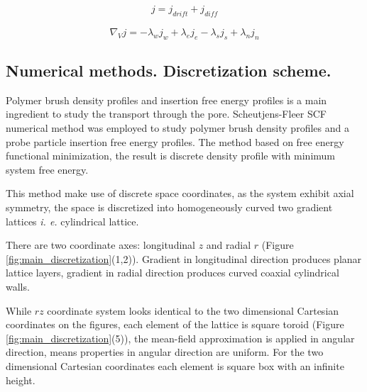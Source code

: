 \documentclass[12pt, a4paper]{article}
\begin{document}
\begin{eqnarray}
    j = j_{drift}+j_{diff}
\end{eqnarray}

\begin{equation}
    \nabla_{V} j = -\lambda_w j_w + \lambda_e j_e - \lambda_s j_s + \lambda_n j_n
\end{equation}





\subsection{Numerical methods. Discretization scheme.}
Polymer brush density profiles and insertion free energy profiles is a main ingredient to study the transport through the pore.  
Scheutjens-Fleer SCF numerical method was employed to study polymer brush density profiles and a probe particle insertion free energy profiles.
The method based on free energy functional minimization, the result is discrete density profile with minimum system free energy.

This method make use of discrete space coordinates, as the system exhibit axial symmetry, the space is discretized into homogeneously curved two gradient lattices \emph{i. e.} cylindrical lattice.

There are two coordinate axes: longitudinal $z$ and radial $r$ (Figure \ref{fig:main_discretization}(1,2)). 
Gradient in longitudinal direction produces planar lattice layers, gradient in radial direction produces curved coaxial cylindrical walls.

While $rz$ coordinate system looks identical to the two dimensional Cartesian coordinates on the figures, each element of the lattice is square toroid (Figure \ref{fig:main_discretization}(5)), the mean-field approximation is applied in angular direction, means properties in angular direction are uniform.
For the two dimensional Cartesian coordinates each element is square box with an infinite height.
\end{document}
